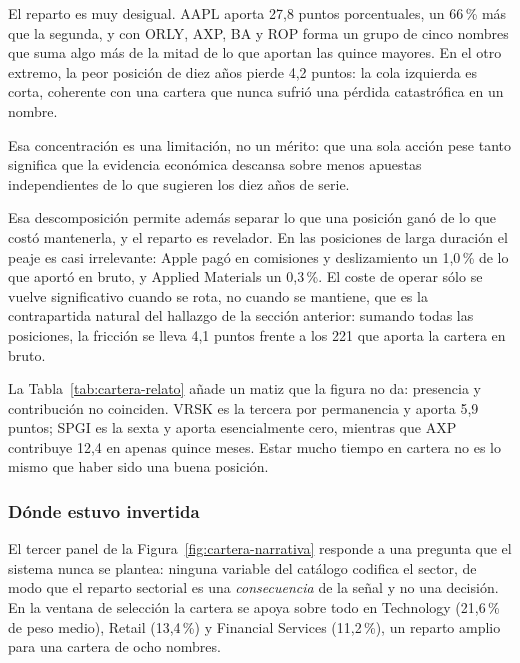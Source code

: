 El reparto es muy desigual. AAPL aporta 27,8 puntos porcentuales, un 66\,\% más que la
segunda, y con ORLY, AXP, BA y ROP forma un grupo de cinco nombres que suma algo más de la mitad de
lo que aportan las quince mayores. En el otro extremo, la peor posición de diez años pierde 4,2
puntos: la cola izquierda es corta, coherente con una cartera que nunca sufrió una pérdida
catastrófica en un nombre.

Esa concentración es una limitación, no un mérito: que una sola acción pese tanto significa
que la evidencia económica descansa sobre menos apuestas independientes de lo que sugieren los diez
años de serie.

\begin{table}[htbp]
  \centering
  \small
  \caption{Las diez acciones más presentes en la cartera durante la ventana de selección.}
  \label{tab:cartera-relato}
  
  \caption*{«Episodios» cuenta las veces que la acción entró en cartera: dos episodios significan
  que se vendió y se recompró más tarde. La contribución neta es a la rentabilidad de la cartera,
  no a su exceso sobre el índice.}
\end{table}

Esa descomposición permite además separar lo que una posición ganó de lo que costó mantenerla, y el
reparto es revelador. En las posiciones de larga duración el peaje es casi irrelevante: Apple pagó en
comisiones y deslizamiento un 1,0\,\% de lo que aportó en bruto, y Applied Materials un 0,3\,\%. El
coste de operar sólo se vuelve significativo cuando se rota, no cuando se mantiene, que es la
contrapartida natural del hallazgo de la sección anterior: sumando todas las posiciones, la fricción
se lleva 4,1 puntos frente a los 221 que aporta la cartera en bruto.

La Tabla~\ref{tab:cartera-relato} añade un matiz que la figura no da: presencia y contribución no
coinciden. VRSK es la tercera por permanencia y aporta 5,9 puntos; SPGI es la sexta y aporta
esencialmente cero, mientras que AXP contribuye 12,4 en apenas quince meses. Estar mucho tiempo en
cartera no es lo mismo que haber sido una buena posición.

\subsubsection*{Dónde estuvo invertida}

El tercer panel de la Figura~\ref{fig:cartera-narrativa} responde a una pregunta que el sistema
nunca se plantea: ninguna variable del catálogo codifica el sector, de modo que el reparto sectorial
es una \emph{consecuencia} de la señal y no una decisión. En la ventana de selección la cartera se
apoya sobre todo en Technology (21,6\,\% de peso medio), Retail (13,4\,\%) y Financial Services
(11,2\,\%), un reparto amplio para una cartera de ocho nombres.

